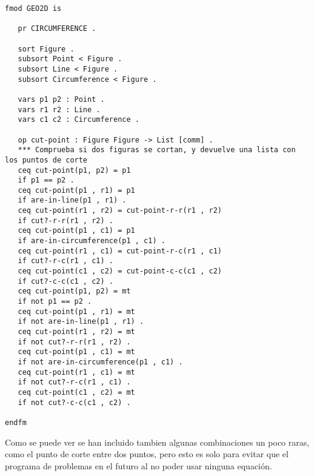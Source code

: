 \begin{verbatim}
fmod GEO2D is

   pr CIRCUMFERENCE .

   sort Figure .
   subsort Point < Figure .
   subsort Line < Figure .
   subsort Circumference < Figure .

   vars p1 p2 : Point .
   vars r1 r2 : Line .
   vars c1 c2 : Circumference .

   op cut-point : Figure Figure -> List [comm] .
   *** Comprueba si dos figuras se cortan, y devuelve una lista con los puntos de corte
   ceq cut-point(p1, p2) = p1
   if p1 == p2 .
   ceq cut-point(p1 , r1) = p1
   if are-in-line(p1 , r1) .
   ceq cut-point(r1 , r2) = cut-point-r-r(r1 , r2)
   if cut?-r-r(r1 , r2) .
   ceq cut-point(p1 , c1) = p1
   if are-in-circumference(p1 , c1) .
   ceq cut-point(r1 , c1) = cut-point-r-c(r1 , c1)
   if cut?-r-c(r1 , c1) .
   ceq cut-point(c1 , c2) = cut-point-c-c(c1 , c2)
   if cut?-c-c(c1 , c2) .
   ceq cut-point(p1, p2) = mt
   if not p1 == p2 .	
   ceq cut-point(p1 , r1) = mt
   if not are-in-line(p1 , r1) .
   ceq cut-point(r1 , r2) = mt 
   if not cut?-r-r(r1 , r2) .
   ceq cut-point(p1 , c1) = mt
   if not are-in-circumference(p1 , c1) .
   ceq cut-point(r1 , c1) = mt
   if not cut?-r-c(r1 , c1) .
   ceq cut-point(c1 , c2) = mt
   if not cut?-c-c(c1 , c2) .

endfm	
\end{verbatim}

Como se puede ver se han incluido tambien algunas combinaciones un poco raras, como el punto de corte entre dos puntos, pero esto es solo para evitar que el programa de problemas en el futuro al no poder usar ninguna equaci\'on.
